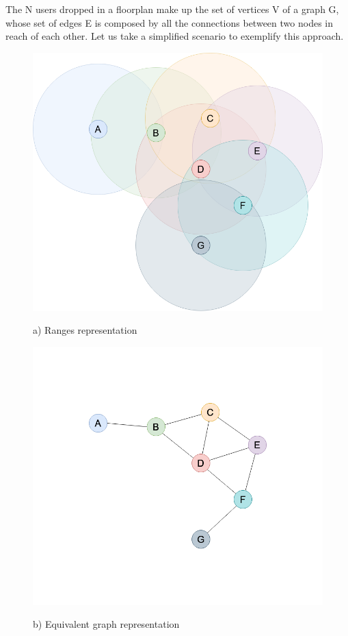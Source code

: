 The N users dropped in a floorplan make up the set of vertices V of a graph G, whose set of edges E is composed by all the connections between two nodes in reach of each other. Let us take a simplified scenario to exemplify this approach.
\begin{figure}[h]
	\begin{minipage}{.5\textwidth}
        \includegraphics[scale=.23]{img/wireless_graph_1.png}
        \begin{center}
            a) Ranges representation
        \end{center}
	\end{minipage}
	\begin{minipage}{.5\textwidth} 
		\includegraphics[scale=.23]{img/wireless_graph_2.png}
		\begin{center}
            b) Equivalent graph representation
        \end{center}
	\end{minipage}
	\caption{}
    \label{fig:graph1}
\end{figure}

